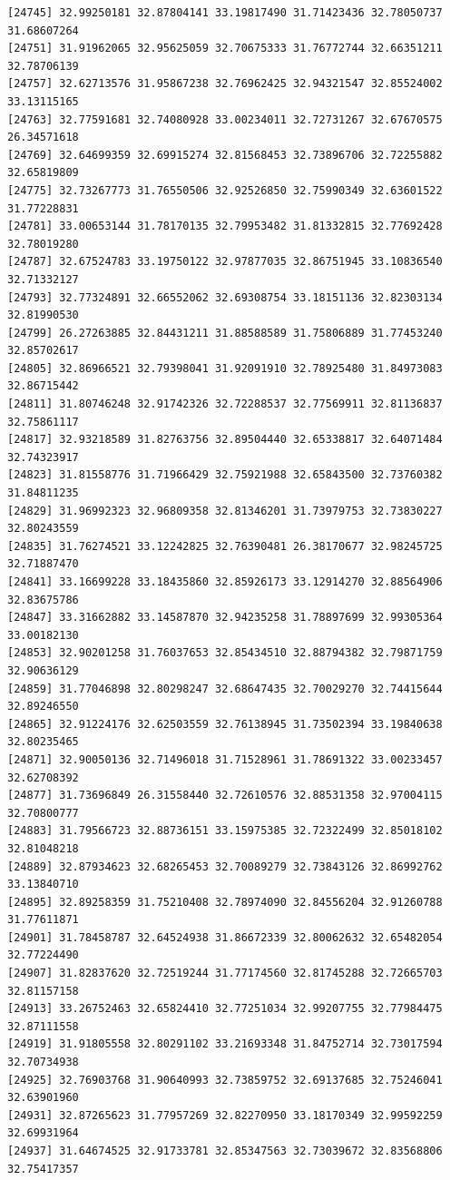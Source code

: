 \documentclass[
  letterpaper,
  DIV=11,
  numbers=noendperiod]{scrartcl}
\begin{document}
\begin{verbatim}
[24745] 32.99250181 32.87804141 33.19817490 31.71423436 32.78050737 31.68607264
[24751] 31.91962065 32.95625059 32.70675333 31.76772744 32.66351211 32.78706139
[24757] 32.62713576 31.95867238 32.76962425 32.94321547 32.85524002 33.13115165
[24763] 32.77591681 32.74080928 33.00234011 32.72731267 32.67670575 26.34571618
[24769] 32.64699359 32.69915274 32.81568453 32.73896706 32.72255882 32.65819809
[24775] 32.73267773 31.76550506 32.92526850 32.75990349 32.63601522 31.77228831
[24781] 33.00653144 31.78170135 32.79953482 31.81332815 32.77692428 32.78019280
[24787] 32.67524783 33.19750122 32.97877035 32.86751945 33.10836540 32.71332127
[24793] 32.77324891 32.66552062 32.69308754 33.18151136 32.82303134 32.81990530
[24799] 26.27263885 32.84431211 31.88588589 31.75806889 31.77453240 32.85702617
[24805] 32.86966521 32.79398041 31.92091910 32.78925480 31.84973083 32.86715442
[24811] 31.80746248 32.91742326 32.72288537 32.77569911 32.81136837 32.75861117
[24817] 32.93218589 31.82763756 32.89504440 32.65338817 32.64071484 32.74323917
[24823] 31.81558776 31.71966429 32.75921988 32.65843500 32.73760382 31.84811235
[24829] 31.96992323 32.96809358 32.81346201 31.73979753 32.73830227 32.80243559
[24835] 31.76274521 33.12242825 32.76390481 26.38170677 32.98245725 32.71887470
[24841] 33.16699228 33.18435860 32.85926173 33.12914270 32.88564906 32.83675786
[24847] 33.31662882 33.14587870 32.94235258 31.78897699 32.99305364 33.00182130
[24853] 32.90201258 31.76037653 32.85434510 32.88794382 32.79871759 32.90636129
[24859] 31.77046898 32.80298247 32.68647435 32.70029270 32.74415644 32.89246550
[24865] 32.91224176 32.62503559 32.76138945 31.73502394 33.19840638 32.80235465
[24871] 32.90050136 32.71496018 31.71528961 31.78691322 33.00233457 32.62708392
[24877] 31.73696849 26.31558440 32.72610576 32.88531358 32.97004115 32.70800777
[24883] 31.79566723 32.88736151 33.15975385 32.72322499 32.85018102 32.81048218
[24889] 32.87934623 32.68265453 32.70089279 32.73843126 32.86992762 33.13840710
[24895] 32.89258359 31.75210408 32.78974090 32.84556204 32.91260788 31.77611871
[24901] 31.78458787 32.64524938 31.86672339 32.80062632 32.65482054 32.77224490
[24907] 31.82837620 32.72519244 31.77174560 32.81745288 32.72665703 32.81157158
[24913] 33.26752463 32.65824410 32.77251034 32.99207755 32.77984475 32.87111558
[24919] 31.91805558 32.80291102 33.21693348 31.84752714 32.73017594 32.70734938
[24925] 32.76903768 31.90640993 32.73859752 32.69137685 32.75246041 32.63901960
[24931] 32.87265623 31.77957269 32.82270950 33.18170349 32.99592259 32.69931964
[24937] 31.64674525 32.91733781 32.85347563 32.73039672 32.83568806 32.75417357

\end{verbatim}
\end{document}
